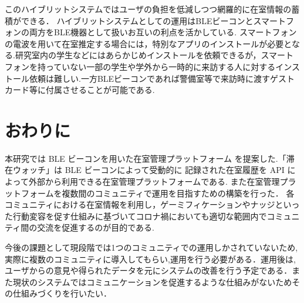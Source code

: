 \documentclass[a4j,8pt,twocolumn]{extarticle}
\begin{document}
このハイブリットシステムではユーザの負担を低減しつつ網羅的に在室情報の蓄積ができる．
ハイブリットシステムとしての運用はBLEビーコンとスマートフォンの両方をBLE機器として扱いお互いの利点を活かしている.
スマートフォンの電波を用いて在室推定する場合には，特別なアプリのインストールが必要となる.研究室内の学生などにはあらかじめインストールを依頼できるが，スマートフォンを持っていない一部の学生や学外から一時的に来訪する人に対するインストール依頼は難しい.一方BLEビーコンであれば警備室等で来訪時に渡すゲストカード等に付属させることが可能である.






\section{おわりに}
本研究では BLE ビーコンを用いた在室管理プラットフォーム を提案した.「滞在ウォッチ」は BLE ビーコンによって受動的に 記録された在室履歴を API によって外部から利用できる在室管理プラットフォームである.
また在室管理プラットフォームを複数間のコミュニティで運用を目指すための構築を行った．
各コミュニティにおける在室情報を利用し，ゲーミフィケーションやナッジといった行動変容を促す仕組みに基づいてコロナ禍においても適切な範囲内でコミュニティ間の交流を促進するのが目的である.

今後の課題として現段階では1つのコミュニティでの運用しかされていないため,実際に複数のコミュニティに導入してもらい,運用を行う必要がある．運用後は,ユーザからの意見や得られたデータを元にシステムの改善を行う予定である．また現状のシステムではコミュニケーションを促進するような仕組みがないためその仕組みづくりを行いたい．
\end{document}
